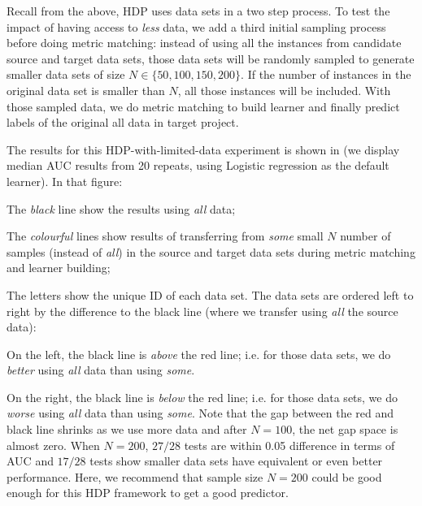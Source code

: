 Recall from the above,
HDP uses  data sets  in a two step process.
To test the impact of having access to {\em less} data,
we  add a third initial sampling process before doing metric matching:
instead of using all the instances from
candidate source and target data sets, those data sets will
be randomly sampled to generate smaller data sets of
size $N \in \{50, 100, 150, 200\}$. If
the number of instances in the original data set is
smaller than $N$, all those instances will be
included. With those sampled data, we do metric matching to build learner
and finally predict labels of the original all data in  target project.

The results for this HDP-with-limited-data experiment is shown in 
(we display median AUC results from 20 repeats, using  Logistic regression
as the default learner). 
In that figure:
\bi
\item
  The {\em black} line show the results using {\em all} data;
\item
  The {\em colourful} lines show results of transferring from {\em some} small $N$ number of samples (instead of {\em all})
  in the source and target data sets during metric matching and learner building;
\item
  The letters show the unique ID of each data set.
\ei
The data sets are ordered left to right by the difference to the black line (where we transfer using {\em
  all} the source data):
\bi
\item
  On the left, the black line is
  {\em above} the red line; i.e. for those data sets, we do {\em better} using
  {\em all} data than using {\em some}.
  \item
On the right, the black line is {\em below} the red
line; i.e. for those data sets, we do {\em worse}
using {\em all} data than using {\em some}.  \ei
Note that the gap between the red and black line
shrinks as we use more data and after $N=100$, the
net gap space is almost zero.  When $N=200$, $27/28$
tests are within 0.05 difference in terms of AUC and
$17/28$ tests show smaller data sets have equivalent
or even better performance. Here, we recommend that
sample size $N=200$ could be good enough for this
HDP framework to get a good predictor.




